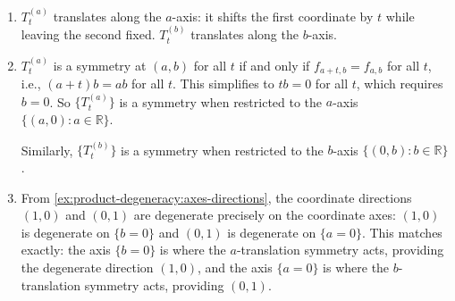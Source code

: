 \documentclass[11pt]{article}
\newcommand{\R}{\mathbb{R}}
\begin{document}
\begin{solution}
\begin{enumerate}
    \item $T^{(a)}_t$ translates along the $a$-axis: it shifts the first coordinate by $t$ while leaving the second fixed. $T^{(b)}_t$ translates along the $b$-axis.

    \item $T^{(a)}_t$ is a symmetry at $(a, b)$ for all $t$ if and only if $f_{a+t,b} = f_{a,b}$ for all $t$, i.e., $(a+t)b = ab$ for all $t$. This simplifies to $tb = 0$ for all $t$, which requires $b = 0$. So $\{T^{(a)}_t\}$ is a symmetry when restricted to the $a$-axis $\{(a, 0) : a \in \R\}$.

    Similarly, $\{T^{(b)}_t\}$ is a symmetry when restricted to the $b$-axis $\{(0, b) : b \in \R\}$.

    \item From \cref{ex:product-degeneracy:axes-directions}, the coordinate directions $(1, 0)$ and $(0, 1)$ are degenerate precisely on the coordinate axes: $(1, 0)$ is degenerate on $\{b = 0\}$ and $(0, 1)$ is degenerate on $\{a = 0\}$. This matches exactly: the axis $\{b = 0\}$ is where the $a$-translation symmetry acts, providing the degenerate direction $(1, 0)$, and the axis $\{a = 0\}$ is where the $b$-translation symmetry acts, providing $(0, 1)$. \qedhere
\end{enumerate}
\end{solution}
\end{document}

